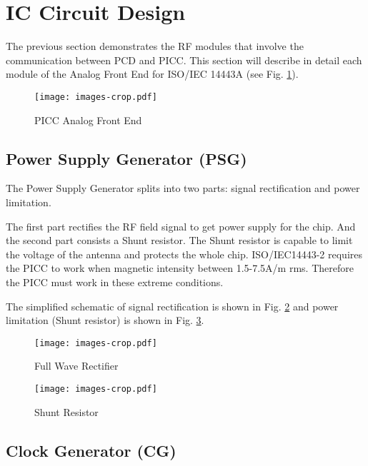 \documentclass[conference]{../../resources/IEEEtran/IEEEtran}
\begin{document}

\section{IC Circuit Design}
\label{sec:design}

The previous section demonstrates the RF modules that involve  the communication between PCD and PICC. This section will describe in detail each module of the Analog Front End for ISO/IEC 14443A (see Fig. \ref{fig:afe}).

\begin{figure}[]
  \centering
  \texttt{[image: images-crop.pdf]}
  \caption{PICC Analog Front End}
  \label{fig:afe}
\end{figure}

\subsection{Power Supply Generator (PSG)}

The Power Supply Generator splits into two parts: signal rectification and power limitation.

The first part rectifies the RF field signal to get power supply for the chip. And the second part consists a Shunt resistor. The Shunt resistor is capable to limit the voltage of the antenna and protects the whole chip. ISO/IEC14443-2 requires the PICC to work when magnetic intensity between 1.5-7.5A/m rms. Therefore the PICC must work in these extreme conditions.  

The simplified schematic of signal rectification is shown in Fig. \ref{fig:rect} and power limitation (Shunt resistor) is shown in Fig. \ref{fig:shunt}.

\begin{figure}[h]
  \centering
  \texttt{[image: images-crop.pdf]}
  \caption{Full Wave Rectifier}
  \label{fig:rect}
\end{figure}

\begin{figure}[h]
  \centering
  \texttt{[image: images-crop.pdf]}
  \caption{Shunt Resistor}
  \label{fig:shunt}
\end{figure}

\subsection{Clock Generator (CG)}
\end{document}
